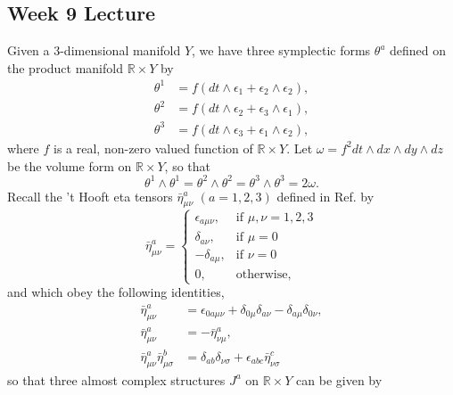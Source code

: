 \documentclass[a4paper,onecolumn,12pt]{article}
\theoremstyle{definition}
\theoremstyle{remark}
\begin{document}
\newpage
\subsection{Week 9 Lecture}

Given a 3-dimensional manifold $Y$, we have three symplectic forms $\theta^{a}$ defined on the product manifold $\mathbb{R}\times Y$ by
\begin{subequations}
	\begin{align}
	\label{three_symp}
	\theta^{1} &= f(dt \wedge \epsilon_{1} +  \epsilon_{2}\wedge \epsilon_{2}), \\ 
	\theta^{2} &= f(dt \wedge \epsilon_{2} +  \epsilon_{3}\wedge \epsilon_{1}), \\
	\theta^{3} &= f(dt \wedge \epsilon_{3} +  \epsilon_{1}\wedge \epsilon_{2}),
\end{align}
\end{subequations}
where $f$ is a real, non-zero valued function of $\mathbb{R}\times Y$. Let $\omega = f^{2} dt\wedge dx\wedge dy \wedge dz$ be the volume form on $\mathbb{R}\times Y$, so that
\begin{equation}
	\theta^{1} \wedge \theta^{1} = \theta^{2} \wedge \theta^{2} = \theta^{3} \wedge \theta^{3} = 2 \omega.
\end{equation}
Recall the 't Hooft eta tensors $\bar{\eta}^{a}_{\mu \nu}$ $(a=1,2,3)$ defined in Ref. \cite{thooft_1976} by
\[
\bar{\eta}^{a}_{\mu \nu}= 
\begin{cases}
\epsilon_{a\mu\nu},& \text{if } \mu,\nu = 1,2,3\\
\delta_{a\nu},& \text{if } \mu = 0\\
-\delta_{a\mu},& \text{if } \nu = 0\\
0,& \text{otherwise,}
\end{cases}
	\]
and which obey the following identities,
\begin{subequations}
	\begin{align}
	\label{thooft}
	\bar{\eta}^{a}_{\mu \nu} &= \epsilon_{0 a\mu\nu} + \delta_{0\mu}\delta_{a\nu} - \delta_{a\mu}\delta_{0\nu},\\
	\bar{\eta}^{a}_{\mu \nu} &= -\bar{\eta}^{a}_{\nu \mu},\\
	\bar{\eta}^{a}_{\mu \nu}\bar{\eta}^{b}_{\mu \sigma} &= \delta_{ab}\delta_{\nu\sigma} + \epsilon_{abc}\bar{\eta}^{c}_{\nu \sigma}
	\end{align}
\end{subequations}
so that three almost complex structures $J^{a}$ on $\mathbb{R}\times Y$ can be given by
\end{document}
